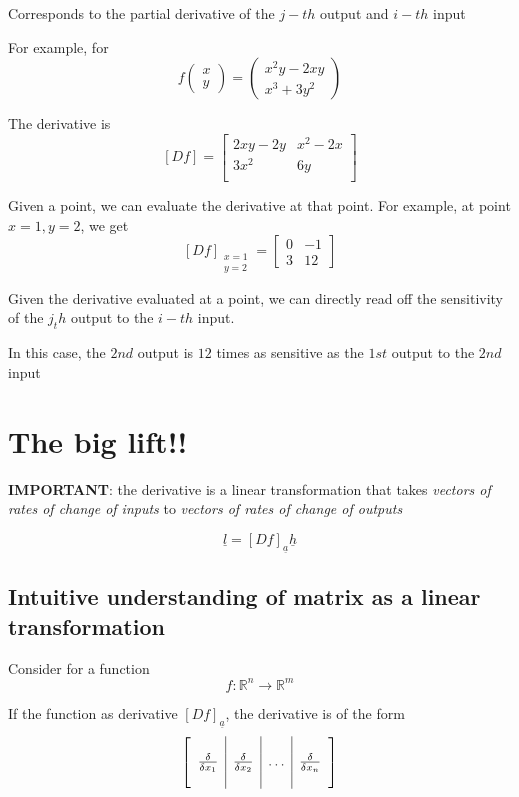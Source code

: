 Corresponds to the partial derivative of the $j-th$ output and $ i-th$ input

For example, for \[
  f \begin{pmatrix} 
    x \\ y  
  \end{pmatrix} = \begin{pmatrix} 
    x^2 y - 2xy \\
    x^3 + 3y^2
  \end{pmatrix}
\] 

The derivative is \[
   [Df] = \begin{bmatrix} 
      2xy - 2y & x^2 - 2x \\
      3x^2 & 6y \\
   \end{bmatrix}
\] 

Given a point, we can evaluate the derivative at that point. For example, at point $x = 1, y =2$, we get
\[
   [Df]_{\substack{x = 1 \\ y = 2}} = \begin{bmatrix} 
      0 & -1 \\ 3 & 12
   \end{bmatrix}
\] 

Given the derivative evaluated at a point, we can directly read off the sensitivity of the $j_th$ output to the $i-th$ input. 


In this case, the $2nd$ output is $12$ times as sensitive as the $1st$ output to the $2nd$ input

\section{The big lift!!} 
\begin{framed}
   \textbf{IMPORTANT}: the derivative is a linear transformation that takes \emph{vectors of rates of change of inputs} to \emph{vectors of rates of change of outputs}

   \[
      \underline{l} = [Df]_{ \underline{a}} \underline{h}
   \] 
\end{framed}

\subsection{Intuitive understanding of matrix as a linear transformation}

Consider for a function \[
  f : \mathbb{R}^n \to \mathbb{R}^m
\]  

If the function as derivative $[Df]_{ \underline{a}}$, the derivative is of the form \[
   \left[
   \begin{array}{c | c | c | c}
      & & &  \\
      \frac{\delta}{\delta x_1} & \frac{\delta}{\delta x_2} & \hdots&\frac{\delta}{\delta x_n} \\
      & & &  \\
   \end{array} \right]
\] 

